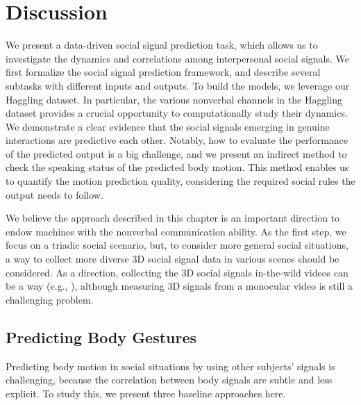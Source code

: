 
\section{Discussion}


We present a data-driven social signal prediction task, which allows us to investigate the dynamics and correlations among interpersonal social signals. We first formalize the social signal prediction framework, and describe several subtasks with different inputs and outputs. To build the models, we leverage our Haggling dataset. In particular, the various nonverbal channels in the Haggling dataset provides a crucial opportunity to computationally study their dynamics. We demonstrate a clear evidence that the social signals emerging in genuine interactions are predictive each other. Notably, how to evaluate the performance of the predicted output is a big challenge, and we present an indirect method to check the speaking status of the predicted body motion. This method enables us to quantify the motion prediction quality, considering the required social rules the output needs to follow. 

We believe the approach described in this chapter is an important direction to endow machines with the nonverbal communication ability. As the first step, we focus on a triadic social scenario, but, to consider more general social situations, a way to collect more diverse 3D social signal data in various scenes should be considered. As a direction, collecting the 3D social signals in-the-wild videos can be a way (e.g., \cite{Xiang2019}), although measuring 3D signals from a monocular video is still a challenging problem.


\subsection{Predicting Body Gestures}
\label{section:pred_body}
Predicting body motion in social situations by using other subjects' signals is challenging, because the correlation between body signals are subtle and less explicit. To study this, we present three baseline approaches here. 

